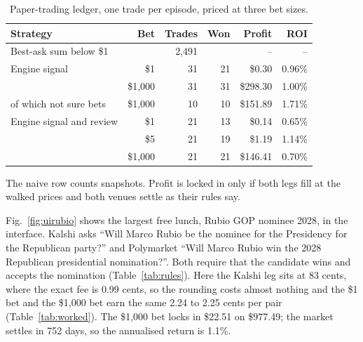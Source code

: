 \documentclass[5p,letterpaper]{elsarticle}
\begin{document}
\begin{table}[tbp]
\caption{Paper-trading ledger, one trade per episode, priced at three bet sizes.}\label{tab:ledger}
\footnotesize
\setlength{\tabcolsep}{3.5pt}
\begin{tabularx}{\columnwidth}{@{}Lrrrrr@{}}
\toprule
Strategy & Bet & Trades & Won & Profit & ROI \\
\midrule
Best-ask sum below \$1 & & 2,491 & & -- & -- \\
\addlinespace
Engine signal & \$1 & 31 & 21 & \$0.30 & 0.96\% \\
 & \$1,000 & 31 & 31 & \$298.30 & 1.00\% \\
\addlinespace
\quad of which not sure bets & \$1,000 & 10 & 10 & \$151.89 & 1.71\% \\
\addlinespace
Engine signal and review & \$1 & 21 & 13 & \$0.14 & 0.65\% \\
 & \$5 & 21 & 19 & \$1.19 & 1.14\% \\
 & \$1,000 & 21 & 21 & \$146.41 & 0.70\% \\
\bottomrule
\end{tabularx}
\par\smallskip\raggedright The naive row counts snapshots. Profit is locked in only if both legs fill at the walked prices and both venues settle as their rules say.
\end{table}

Fig.~\ref{fig:uirubio} shows the largest free lunch, Rubio GOP nominee 2028, in the interface. Kalshi asks ``Will Marco Rubio be the nominee for the Presidency for the Republican party?'' and Polymarket ``Will Marco Rubio win the 2028 Republican presidential nomination?''. Both require that the candidate wins and accepts the nomination (Table~\ref{tab:rules}). Here the Kalshi leg sits at 83 cents, where the exact fee is 0.99 cents, so the rounding costs almost nothing and the \$1 bet and the \$1,000 bet earn the same 2.24 to 2.25 cents per pair (Table~\ref{tab:worked}). The \$1,000 bet locks in \$22.51 on \$977.49; the market settles in 752 days, so the annualised return is 1.1\%.
\end{document}
